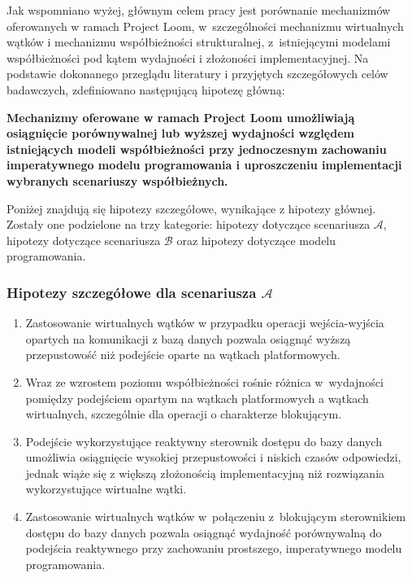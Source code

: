 Jak wspomniano wyżej, głównym celem pracy jest porównanie mechanizmów oferowanych w ramach Project Loom, w~szczególności mechanizmu wirtualnych wątków i mechanizmu współbieżności strukturalnej, z~istniejącymi modelami współbieżności pod kątem wydajności i złożoności implementacyjnej.
Na podstawie dokonanego przeglądu literatury i przyjętych szczegółowych celów badawczych, zdefiniowano następującą hipotezę główną:
\begin{displayquote}
    \textbf{Mechanizmy oferowane w ramach Project Loom umożliwiają osiągnięcie porównywalnej lub wyższej wydajności względem istniejących modeli współbieżności przy jednoczesnym zachowaniu imperatywnego modelu programowania i uproszczeniu implementacji wybranych scenariuszy współbieżnych.}
\end{displayquote}

\noindent
Poniżej znajdują się hipotezy szczegółowe, wynikające z hipotezy głównej. Zostały one podzielone na trzy kategorie: hipotezy dotyczące scenariusza $\mathcal{A}$, hipotezy dotyczące scenariusza $\mathcal{B}$ oraz hipotezy dotyczące modelu programowania.

\subsubsection{Hipotezy szczegółowe dla scenariusza \ensuremath{\mathcal{A}}}
\begin{enumerate}[label=\textbf{H\arabic*.}]
    \item Zastosowanie wirtualnych wątków w przypadku operacji wejścia-wyjścia opartych na komunikacji z bazą danych pozwala osiągnąć wyższą przepustowość niż podejście oparte na wątkach platformowych.
    
    \item Wraz ze wzrostem poziomu współbieżności rośnie różnica w~wydajności pomiędzy podejściem opartym na wątkach platformowych a wątkach wirtualnych, szczególnie dla operacji o charakterze blokującym.

    \item Podejście wykorzystujące reaktywny sterownik dostępu do bazy danych umożliwia osiągnięcie wysokiej przepustowości i niskich czasów odpowiedzi, jednak wiąże się z większą złożonością implementacyjną niż rozwiązania wykorzystujące wirtualne wątki.

    \item Zastosowanie wirtualnych wątków w~połączeniu z~blokującym sterownikiem dostępu do bazy danych pozwala osiągnąć wydajność porównywalną do podejścia reaktywnego przy zachowaniu prostszego, imperatywnego modelu programowania.
\end{enumerate}

